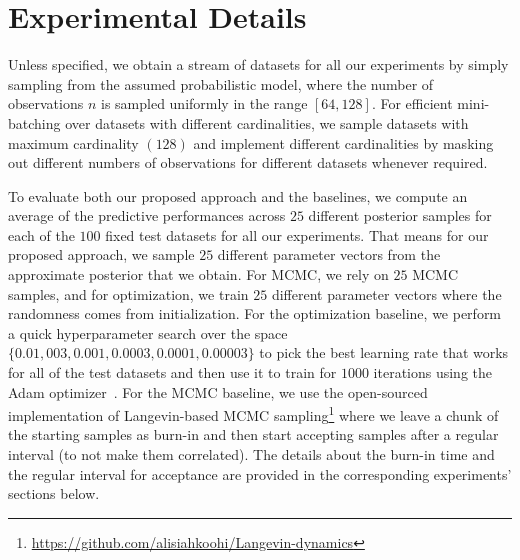 \section{Experimental Details}
\label{appdx:experiment}
Unless specified, we obtain a stream of datasets for all our experiments by simply sampling from the assumed probabilistic model, where the number of observations $n$ is sampled uniformly in the range $[64, 128]$. For efficient mini-batching over datasets with different cardinalities, we sample datasets with maximum cardinality $(128)$ and implement different cardinalities by masking out different numbers of observations for different datasets whenever required. 

To evaluate both our proposed approach and the baselines, we compute an average of the predictive performances across $25$ different posterior samples for each of the $100$ fixed test datasets for all our experiments. 
That means for our proposed approach, we sample $25$ different parameter vectors from the approximate posterior that we obtain. For MCMC, we rely on $25$ MCMC samples, and for optimization, we train $25$ different parameter vectors where the randomness comes from initialization. 
For the optimization baseline, we perform a quick hyperparameter search over the space $\{0.01, 003, 0.001, 0.0003, 0.0001, 0.00003\}$ to pick the best learning rate that works for all of the test datasets and then use it to train for $1000$ iterations using the Adam optimizer~\citep{kingma2014adam}. For the MCMC baseline, we use the open-sourced implementation of Langevin-based MCMC sampling\footnote{\href{https://github.com/alisiahkoohi/Langevin-dynamics}{https://github.com/alisiahkoohi/Langevin-dynamics}} where we leave a chunk of the starting samples as burn-in and then start accepting samples after a regular interval (to not make them correlated). The details about the burn-in time and the regular interval for acceptance are provided in the corresponding experiments' sections below.

